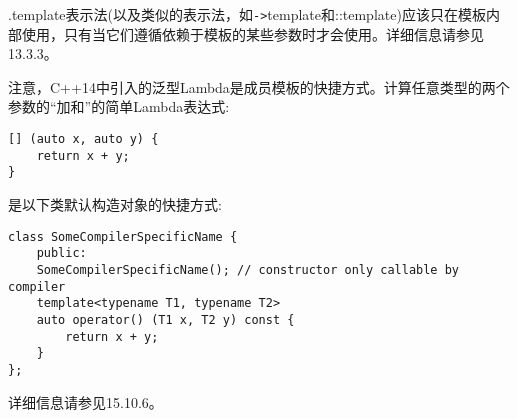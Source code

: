 .template表示法(以及类似的表示法，如\texttt{->}template和::template)应该只在模板内部使用，只有当它们遵循依赖于模板的某些参数时才会使用。详细信息请参见13.3.3。


注意，C++14中引入的泛型Lambda是成员模板的快捷方式。计算任意类型的两个参数的“加和”的简单Lambda表达式:

\begin{lstlisting}[style=styleCXX]
[] (auto x, auto y) {
	return x + y;
}
\end{lstlisting}

是以下类默认构造对象的快捷方式:

\begin{lstlisting}[style=styleCXX]
class SomeCompilerSpecificName {
	public:
	SomeCompilerSpecificName(); // constructor only callable by compiler
	template<typename T1, typename T2>
	auto operator() (T1 x, T2 y) const {
		return x + y;
	}
};
\end{lstlisting}

详细信息请参见15.10.6。







